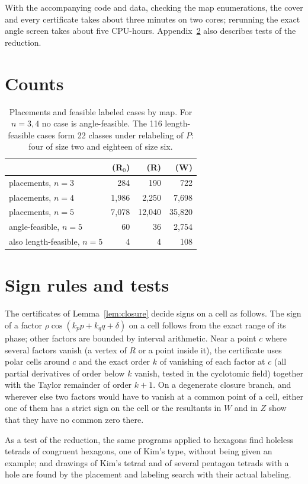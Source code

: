 \documentclass[11pt]{article}
\theoremstyle{definition}
\theoremstyle{remark}
\begin{document}
With the accompanying code and data, checking the map enumerations, the
cover and every certificate takes about three minutes on two cores;
rerunning the exact angle screen takes about
five CPU-hours. Appendix~\ref{app:signs} also describes tests of the reduction.

\begin{appendices}
\section{Counts}\label{app:counts}

\begin{table}[h]
\centering
\begin{tabular}{lrrr}
\toprule
& (R$_0$) & (R) & (W)\\
\midrule
placements, $n=3$ & 284 & 190 & 722\\
placements, $n=4$ & 1{,}986 & 2{,}250 & 7{,}698\\
placements, $n=5$ & 7{,}078 & 12{,}040 & 35{,}820\\
angle-feasible, $n=5$ & 60 & 36 & 2{,}754\\
also length-feasible, $n=5$ & 4 & 4 & 108\\
\bottomrule
\end{tabular}
\caption{Placements and feasible labeled cases by map. For $n=3,4$ no case
is angle-feasible. The 116 length-feasible cases form 22 classes under
relabeling of $P$: four of size two and eighteen of size six.}
\end{table}

\section{Sign rules and tests}\label{app:signs}

The certificates of Lemma~\ref{lem:closure} decide signs on a cell as
follows. The sign of a factor $\rho\cos(k_pp+k_qq+\delta)$
on a cell follows from the exact range of its phase; other factors are
bounded by interval arithmetic. Near a point $c$ where several factors
vanish (a vertex of $R$ or a point inside it), the certificate uses polar
cells around $c$ and the exact
order $k$ of vanishing of each factor at $c$ (all partial derivatives of
order below $k$ vanish, tested in the cyclotomic field) together with the
Taylor remainder of order $k+1$. On a degenerate closure branch, and
wherever else two factors would have to vanish at a common point of a
cell, either one of them has a strict sign on the cell or the resultants in
$W$ and in $Z$ show that they have no common zero there.

As a test of the reduction, the same programs applied to
hexagons find holeless tetrads of congruent hexagons, one of Kim's type,
without being given an example; and drawings of Kim's tetrad and of
several pentagon tetrads with a hole are found by the placement and
labeling search with their actual labeling.
\end{appendices}
\end{document}
